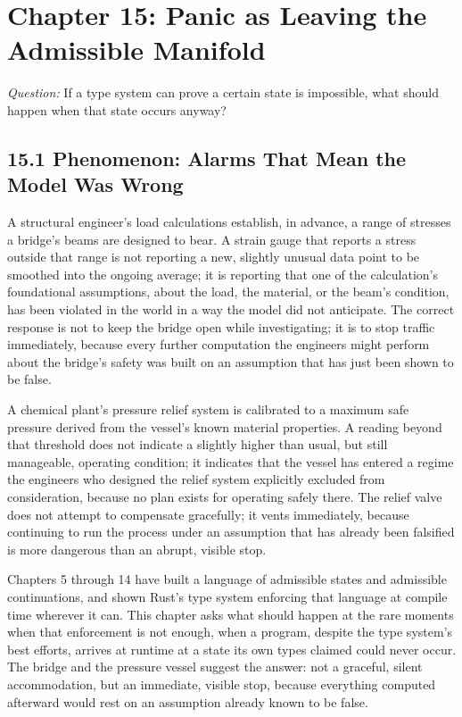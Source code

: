 \documentclass[11pt]{book}
\begin{document}
\clearpage

\chapter*{Chapter 15: Panic as Leaving the Admissible Manifold}

\begin{firstprinciples}
\textit{Question:} If a type system can prove a certain state is impossible, what should happen when that state occurs anyway?
\end{firstprinciples}

\section*{15.1 Phenomenon: Alarms That Mean the Model Was Wrong}

A structural engineer's load calculations establish, in advance, a range of stresses a bridge's beams are designed to bear. A strain gauge that reports a stress outside that range is not reporting a new, slightly unusual data point to be smoothed into the ongoing average; it is reporting that one of the calculation's foundational assumptions, about the load, the material, or the beam's condition, has been violated in the world in a way the model did not anticipate. The correct response is not to keep the bridge open while investigating; it is to stop traffic immediately, because every further computation the engineers might perform about the bridge's safety was built on an assumption that has just been shown to be false.

A chemical plant's pressure relief system is calibrated to a maximum safe pressure derived from the vessel's known material properties. A reading beyond that threshold does not indicate a slightly higher than usual, but still manageable, operating condition; it indicates that the vessel has entered a regime the engineers who designed the relief system explicitly excluded from consideration, because no plan exists for operating safely there. The relief valve does not attempt to compensate gracefully; it vents immediately, because continuing to run the process under an assumption that has already been falsified is more dangerous than an abrupt, visible stop.

Chapters 5 through 14 have built a language of admissible states and admissible continuations, and shown Rust's type system enforcing that language at compile time wherever it can. This chapter asks what should happen at the rare moments when that enforcement is not enough, when a program, despite the type system's best efforts, arrives at runtime at a state its own types claimed could never occur. The bridge and the pressure vessel suggest the answer: not a graceful, silent accommodation, but an immediate, visible stop, because everything computed afterward would rest on an assumption already known to be false.
\end{document}

